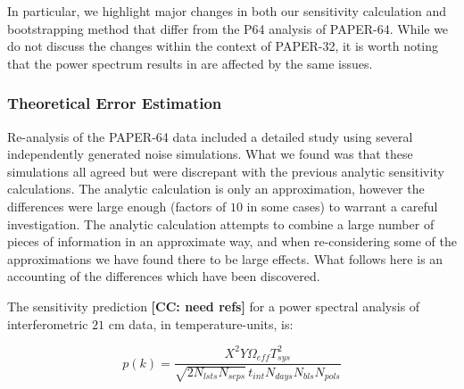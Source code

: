\documentclass[preprint2,numberedappendix,tighten]{aastex6}  %
\newcommand{\cc}[1]{{\color{purple} \textbf{[CC: #1]}}}
\begin{document}
In particular, we highlight major changes in both our sensitivity calculation and bootstrapping method that differ from the P64 analysis of PAPER-64. While we do not discuss the changes within the context of PAPER-32, it is worth noting that the power spectrum results in \citet{parsons_et_al2014} are affected by the same issues.

\subsubsection{Theoretical Error Estimation}
\label{sec:PSSense}

Re-analysis of the PAPER-64 data included a detailed study using several independently generated noise simulations. What we found was that these simulations all agreed but were discrepant with the previous analytic sensitivity calculations. The analytic calculation is only an approximation, however the differences were large enough (factors of $10$ in some cases) to warrant a careful investigation. The analytic calculation attempts to combine a large number of pieces of information in an approximate way, and when re-considering some of the approximations we have found there to be large effects. What follows here is an accounting of the differences which have been discovered.

The sensitivity prediction \cc{need refs} for a power spectral analysis of interferometric $21$ cm data, in temperature-units, is:

\begin{equation}
\label{eq:sense}
p(k) = \frac{X^{2}Y \Omega_{eff} T_{sys}^{2}}{\sqrt{2N_{lsts}N_{seps}}\,t_{int}N_{days}N_{bls}N_{pols}}
\end{equation}
\end{document}
